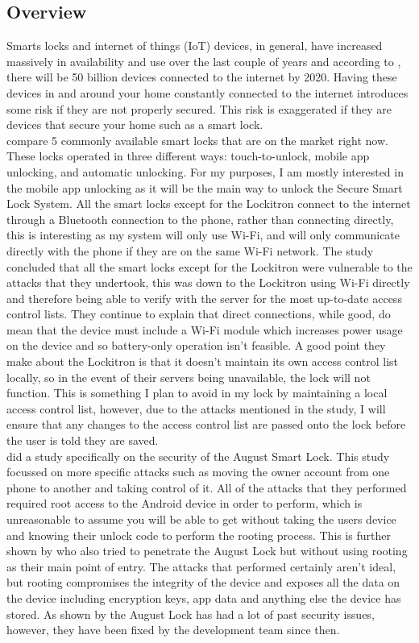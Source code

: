 \subsection{Overview}
Smarts locks and internet of things (IoT) devices, in general, have increased massively in availability and use over the last couple of years and according to \cite{Buhov2016}, there will be 50 billion devices connected to the internet by 2020. Having these devices in and around your home constantly connected to the internet introduces some risk if they are not properly secured. This risk is exaggerated if they are devices that secure your home such as a smart lock.
\\
\indent\cite{Ho2016} compare 5 commonly available smart locks that are on the market right now. These locks operated in three different ways: touch-to-unlock, mobile app unlocking, and automatic unlocking. For my purposes, I am mostly interested in the mobile app unlocking as it will be the main way to unlock the Secure Smart Lock System. All the smart locks except for the Lockitron connect to the internet through a Bluetooth connection to the phone, rather than connecting directly, this is interesting as my system will only use Wi-Fi, and will only communicate directly with the phone if they are on the same Wi-Fi network.  The study concluded that all the smart locks except for the Lockitron were vulnerable to the attacks that they undertook, this was down to the Lockitron using Wi-Fi directly and therefore being able to verify with the server for the most up-to-date access control lists. They continue to explain that direct connections, while good, do mean that the device must include a Wi-Fi module which increases power usage on the device and so battery-only operation isn't feasible. A good point they make about the Lockitron is that it doesn't maintain its own access control list locally, so in the event of their servers being unavailable, the lock will not function. This is something I plan to avoid in my lock by maintaining a local access control list, however, due to the attacks mentioned in the study, I will ensure that any changes to the access control list are passed onto the lock before the user is told they are saved.
\\
\indent\cite{Ye2017} did a study specifically on the security of the August Smart Lock. This study focussed on more specific attacks such as moving the owner account from one phone to another and taking control of it. All of the attacks that they performed required root access to the Android device in order to perform, which is unreasonable to assume you will be able to get without taking the users device and knowing their unlock code to perform the rooting process. This is further shown by \cite{Fuller2017} who also tried to penetrate the August Lock but without using rooting as their main point of entry. The attacks that \cite{Ye2017} performed certainly aren't ideal, but rooting compromises the integrity of the device and exposes all the data on the device including encryption keys, app data and anything else the device has stored. As shown by \cite{Fuller2017} the August Lock has had a lot of past security issues, however, they have been fixed by the development team since then.

